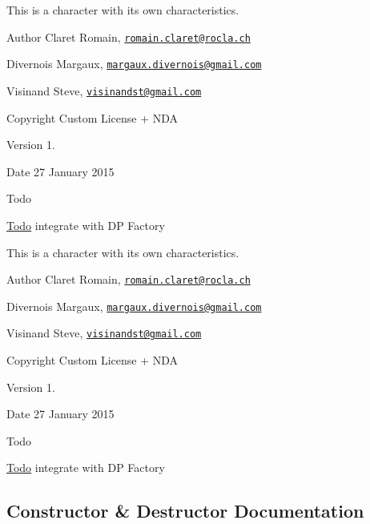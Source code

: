 This is a character with its own characteristics. \begin{DoxyAuthor}{Author}
Claret Romain, \href{mailto:romain.claret@rocla.ch}{\tt romain.\+claret@rocla.\+ch} 

Divernois Margaux, \href{mailto:margaux.divernois@gmail.com}{\tt margaux.\+divernois@gmail.\+com} 

Visinand Steve, \href{mailto:visinandst@gmail.com}{\tt visinandst@gmail.\+com} 
\end{DoxyAuthor}
\begin{DoxyCopyright}{Copyright}
Custom License + N\+D\+A 
\end{DoxyCopyright}
\begin{DoxyVersion}{Version}
1. 
\end{DoxyVersion}
\begin{DoxyDate}{Date}
27 January 2015 
\end{DoxyDate}
\begin{DoxyRefDesc}{Todo}
\item[\hyperlink{todo__todo000004}{Todo}]integrate with D\+P Factory \end{DoxyRefDesc}


This is a character with its own characteristics. \begin{DoxyAuthor}{Author}
Claret Romain, \href{mailto:romain.claret@rocla.ch}{\tt romain.\+claret@rocla.\+ch} 

Divernois Margaux, \href{mailto:margaux.divernois@gmail.com}{\tt margaux.\+divernois@gmail.\+com} 

Visinand Steve, \href{mailto:visinandst@gmail.com}{\tt visinandst@gmail.\+com} 
\end{DoxyAuthor}
\begin{DoxyCopyright}{Copyright}
Custom License + N\+D\+A 
\end{DoxyCopyright}
\begin{DoxyVersion}{Version}
1. 
\end{DoxyVersion}
\begin{DoxyDate}{Date}
27 January 2015 
\end{DoxyDate}
\begin{DoxyRefDesc}{Todo}
\item[\hyperlink{todo__todo000017}{Todo}]integrate with D\+P Factory \end{DoxyRefDesc}


\subsection{Constructor \& Destructor Documentation}
\hypertarget{class_e___loup_a93c72a161ae4093e7bb9ab7d495ca555}{}
